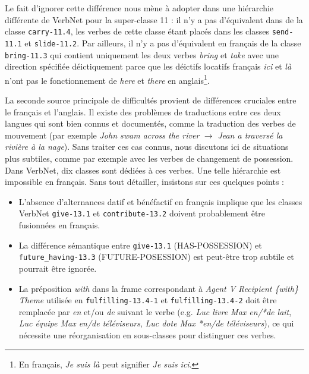 Le fait d'ignorer cette différence nous mène à adopter dans \verbenet{} une
hiérarchie différente de VerbNet pour la super-classe 11 : il n'y a pas
d'équivalent dans \verbenet{} de la classe {\color{blue}\texttt{carry-11.4}},
les verbes de cette classe étant placés dans les classes
{\color{blue}\texttt{send-11.1}} et {\color{blue}\texttt{slide-11.2}}. Par
ailleurs, il n'y a pas d'équivalent en français de la classe
{\color{blue}\texttt{bring-11.3}} qui contient uniquement les deux verbes
\textit{bring} et \textit{take} avec une direction spécifiée déictiquement
\citep[page 135]{levin1993english} parce que les déictifs locatifs français
\textit{ici} et \textit{là} n'ont pas le fonctionnement de \textit{here} et
\textit{there} en anglais\footnote{En français, \textit{Je suis là} peut
signifier \textit{Je suis ici}.}.

La seconde source principale de difficultés provient de différences cruciales
entre le français et l'anglais. Il existe des problèmes de traductions entre
ces deux langues qui sont bien connus et documentés, comme la traduction des
verbes de mouvement (par exemple \textit{John swam across the river}
$\rightarrow$ \textit{Jean a traversé la rivière à la nage}). Sans traiter ces
cas connus, nous discutons ici de situations plus subtiles, comme par exemple
avec les verbes de changement de possession. Dans VerbNet, dix classes sont
dédiées à ces verbes. Une telle hiérarchie est impossible en français. Sans
tout détailler, insistons sur ces quelques points :


\begin{itemize}
    \item L'absence d'alternances datif et bénéfactif en français implique que
        les classes VerbNet {\color{blue}\texttt{give-13.1}} et
        {\color{blue}\texttt{contribute-13.2}} doivent probablement être fusionnées en
        français.
    \item La différence sémantique entre {\color{blue}\texttt{give-13.1}}
        (HAS-POSSESSION) et {\color{blue}\texttt{future\_having-13.3}}
        (FUTURE-POSESSION) est peut-être trop subtile et pourrait être ignorée.
    \item La préposition \textit{with} dans la frame correspondant à \textit{Agent
        V Recipient \{with\} Theme} utilisée en
        {\color{blue}\texttt{fulfilling-13.4-1}} et
        {\color{blue}\texttt{fulfilling-13.4-2}} doit être remplacée par
        \textit{en} et/ou \textit{de} suivant le verbe (e.g. \textit{Luc livre Max
        en/*de lait}, \textit{Luc équipe Max en/de téléviseurs}, \textit{Luc dote
        Max *en/de téléviseurs}), ce qui nécessite une réorganisation en
        sous-classes pour distinguer ces verbes.
\end{itemize}


